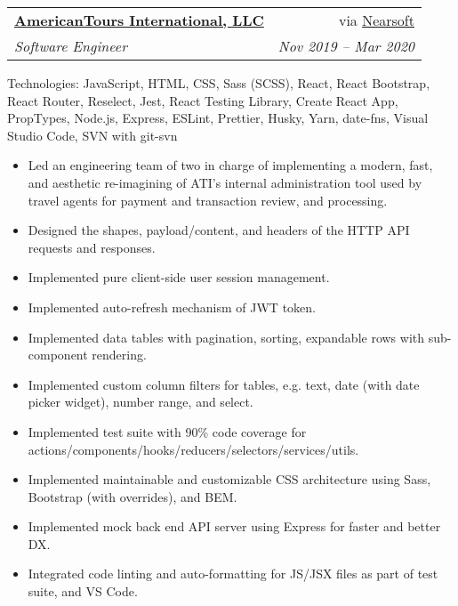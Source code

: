 \documentclass[letterpaper,11pt]{article}
\makeatletter
\newcommand{\resumeItem}[1]{
  \item\small{
    {#1 \vspace{-2pt}}
  }
}
\newcommand{\resumeSubheading}[4]{
  \vspace{0pt}\item
    \begin{tabular*}{0.97\textwidth}[t]{l@{\extracolsep{\fill}}r}
      \textbf{#1} & #2 \\
      \textit{\small#3} & \textit{\small #4}\vspace{5pt}\\
    \end{tabular*}\vspace{0pt}
}
\newcommand{\resumeItemListStart}{\begin{itemize}}
\newcommand{\resumeItemListEnd}{\end{itemize}\vspace{-5pt}}
\makeatother
\begin{document}
    \resumeSubheading
      {\href{https://americantours.com/}{AmericanTours International, LLC}}{via \href{https://nearsoft.com}{Nearsoft}}
      {Software Engineer}{Nov 2019 – Mar 2020}
      {\footnotesize Technologies: JavaScript, HTML, CSS, Sass (SCSS), React, React Bootstrap, React Router, Reselect, Jest, React Testing Library, Create React App, PropTypes, Node.js, Express, ESLint, Prettier, Husky, Yarn, date-fns, Visual Studio Code, SVN with git-svn}
      \resumeItemListStart
        \resumeItem
          {Led an engineering team of two in charge of implementing a modern, fast, and aesthetic re-imagining of ATI's internal administration tool used by travel agents for payment and transaction review, and processing.}
        \resumeItem
          {Designed the shapes, payload/content, and headers of the HTTP API requests and responses.}
        \resumeItem
          {Implemented pure client-side user session management.}
        \resumeItem
          {Implemented auto-refresh mechanism of JWT token.}
        \resumeItem
          {Implemented data tables with pagination, sorting, expandable rows with sub-component rendering.}
        \resumeItem
          {Implemented custom column filters for tables, e.g. text, date (with date picker widget), number range, and select.}
        \resumeItem
          {Implemented test suite with 90\% code coverage for actions/components/hooks/reducers/selectors/services/utils.}
        \resumeItem
          {Implemented maintainable and customizable CSS architecture using Sass, Bootstrap (with overrides), and BEM.}
        \resumeItem
          {Implemented mock back end API server using Express for faster and better DX.}
        \resumeItem
          {Integrated code linting and auto-formatting for JS/JSX files as part of test suite, and VS Code.}
      \resumeItemListEnd
\end{document}
